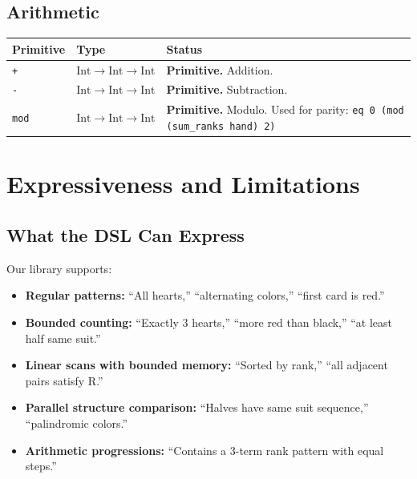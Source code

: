 \documentclass[11pt]{article}
\begin{document}
\subsection{Arithmetic}

\begin{center}
\begin{tabular}{llp{7cm}}
\toprule
\textbf{Primitive} & \textbf{Type} & \textbf{Status} \\
\midrule
\texttt{+} & $\text{Int} \to \text{Int} \to \text{Int}$ & \textbf{Primitive.} Addition. \\
\texttt{-} & $\text{Int} \to \text{Int} \to \text{Int}$ & \textbf{Primitive.} Subtraction. \\
\texttt{mod} & $\text{Int} \to \text{Int} \to \text{Int}$ & \textbf{Primitive.} Modulo. Used for parity: \texttt{eq 0 (mod (sum\_ranks hand) 2)} \\
\bottomrule
\end{tabular}
\end{center}

\section{Expressiveness and Limitations}

\subsection{What the DSL Can Express}

Our library supports:

\begin{itemize}
    \item \textbf{Regular patterns:} ``All hearts,'' ``alternating colors,'' ``first card is red.''
    \item \textbf{Bounded counting:} ``Exactly 3 hearts,'' ``more red than black,'' ``at least half same suit.''
    \item \textbf{Linear scans with bounded memory:} ``Sorted by rank,'' ``all adjacent pairs satisfy R.''
    \item \textbf{Parallel structure comparison:} ``Halves have same suit sequence,'' ``palindromic colors.''
    \item \textbf{Arithmetic progressions:} ``Contains a 3-term rank pattern with equal steps.''
\end{itemize}
\end{document}
